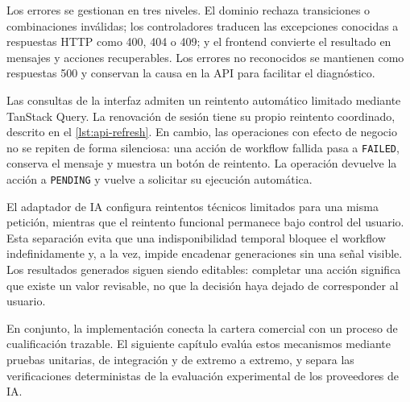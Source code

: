 Los errores se gestionan en tres niveles. El dominio rechaza transiciones o
combinaciones inválidas; los controladores traducen las excepciones conocidas
a respuestas HTTP como 400, 404 o 409; y el frontend convierte el resultado en
mensajes y acciones recuperables. Los errores no reconocidos se mantienen como
respuestas 500 y conservan la causa en la API para facilitar el diagnóstico.

Las consultas de la interfaz admiten un reintento automático limitado mediante
TanStack Query. La renovación de sesión tiene su propio reintento coordinado,
descrito en el \cref{lst:api-refresh}. En cambio, las operaciones con efecto de
negocio no se repiten de forma silenciosa: una acción de workflow fallida pasa
a \texttt{FAILED}, conserva el mensaje y muestra un botón de reintento. La
operación devuelve la acción a \texttt{PENDING} y vuelve a solicitar su
ejecución automática.

El adaptador de IA configura reintentos técnicos limitados para una misma
petición, mientras que el reintento funcional permanece bajo control del
usuario. Esta separación evita que una indisponibilidad temporal bloquee el
workflow indefinidamente y, a la vez, impide encadenar generaciones sin una
señal visible. Los resultados generados siguen siendo editables: completar una
acción significa que existe un valor revisable, no que la decisión haya dejado
de corresponder al usuario.

En conjunto, la implementación conecta la cartera comercial con un proceso de
cualificación trazable. El siguiente capítulo evalúa estos mecanismos mediante
pruebas unitarias, de integración y de extremo a extremo, y separa las
verificaciones deterministas de la evaluación experimental de los proveedores
de IA.
